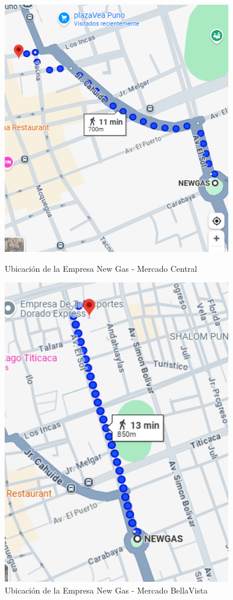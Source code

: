 \documentclass[11pt, a4paper]{article}
\begin{document}
\begin{figure}[H]
\centering
\begin{minipage}{0.48\textwidth}
  \centering
  \includegraphics[width=0.9\textwidth]{central.png}
  \caption{Ubicación de la Empresa New Gas - Mercado Central}
  \label{fig:central}
\end{minipage}\hfill
\begin{minipage}{0.48\textwidth}
  \centering
  \includegraphics[width=0.9\textwidth]{bellavista.png}
  \caption{Ubicación de la Empresa New Gas - Mercado BellaVista}
  \label{fig:bellavista}
\end{minipage}
\end{figure}
\end{document}
